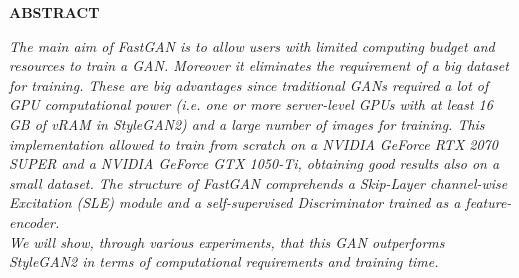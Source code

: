 \documentclass[12pt]{article}
\begin{document}
\begin{center}
	
	\normalsize\MakeUppercase{\textbf{Abstract}\vspace*{0.35cm}}
	
	\begin{minipage}[t]{0.9\textwidth}
	\textit{The main aim of FastGAN is to allow users with limited computing budget and resources to 
	train a GAN. Moreover it eliminates the requirement of a big dataset for training.
	These are big advantages since traditional GANs required a lot of GPU computational power
	(i.e. one or more server-level GPUs with at least 16 GB of vRAM in StyleGAN2) and a large number of 
	images for training. 
	This implementation allowed to train from scratch on a NVIDIA GeForce RTX 2070 SUPER and a 
	NVIDIA GeForce GTX 1050-Ti, obtaining good results also on a small dataset. 
	The structure of FastGAN comprehends a Skip-Layer channel-wise Excitation (SLE) module and a self-supervised
	Discriminator trained as a feature-encoder.\\
	We will show, through various experiments, that this GAN outperforms StyleGAN2 in terms of computational requirements
	and training time.
	}
	\end{minipage}

\end{center}


\end{document}
